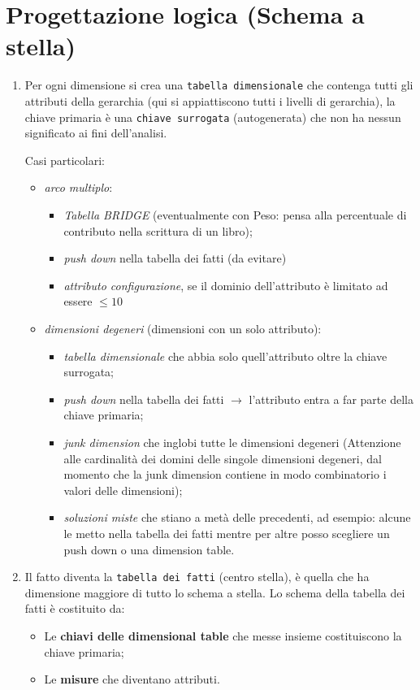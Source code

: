 \documentclass[12pt]{article}
\begin{document}
\section {Progettazione logica (Schema a stella)}

\begin{enumerate}
   
    \item Per ogni dimensione si crea una \texttt{tabella dimensionale} che contenga tutti gli attributi della gerarchia (qui si appiattiscono tutti i livelli di gerarchia), la chiave primaria è una \texttt{chiave surrogata} (autogenerata) che non ha nessun significato ai fini dell'analisi.

    Casi particolari: 
    \begin{itemize}
        \item \textsl{arco multiplo}:
        \begin{itemize}
            \item \textit{Tabella BRIDGE} (eventualmente con Peso: pensa alla percentuale di contributo nella scrittura di un libro); 
            \item \textit{push down} nella tabella dei fatti (da evitare)
            \item \textit{attributo configurazione}, se il dominio dell'attributo è limitato ad essere $\leq 10$
        \end{itemize}
        \item \textsl{dimensioni degeneri} (dimensioni con un solo attributo):
        \begin{itemize}
            \item \textit{tabella dimensionale} che abbia solo quell'attributo oltre la chiave surrogata;
            \item \textit{push down} nella tabella dei fatti $\rightarrow$ l'attributo entra a far parte della chiave primaria;
            \item \textit{junk dimension} che inglobi tutte le dimensioni degeneri (Attenzione alle cardinalità dei domini delle singole dimensioni degeneri, dal momento che la junk dimension contiene in modo combinatorio i valori delle dimensioni);
            \item \textit{soluzioni miste} che stiano a metà delle precedenti, ad esempio: alcune le metto nella tabella dei fatti mentre per altre posso scegliere un push down o una dimension table.
        \end{itemize}
    \end{itemize}

    

     \item Il fatto diventa la \texttt{tabella dei fatti} (centro stella), è quella che ha dimensione maggiore di tutto lo schema a stella. Lo schema della tabella dei fatti è costituito da:
    \begin{itemize}
        \item Le \textbf{chiavi delle dimensional table} che messe insieme costituiscono la chiave primaria;
        \item Le \textbf{misure} che diventano attributi.
    \end{itemize}
\end{enumerate}
\end{document}
